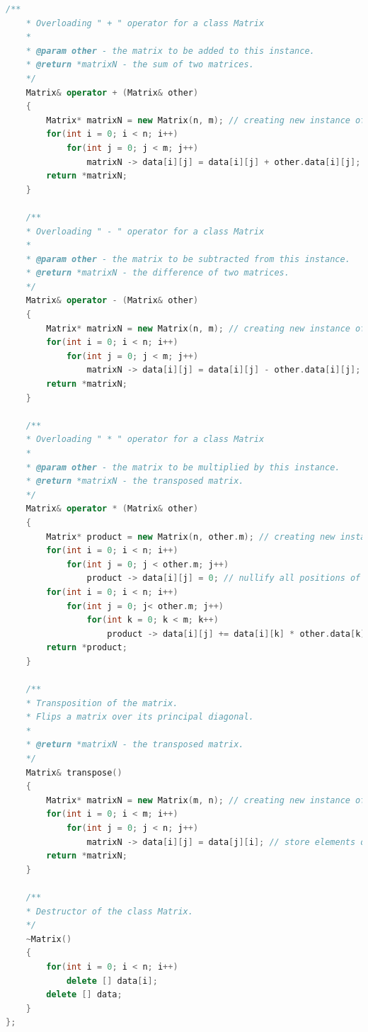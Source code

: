 \documentclass[11pt]{article}
\begin{document}
\begin{lstlisting}[language=C++, caption=Implementation of Predator-prey model]
    /**
    * Overloading " + " operator for a class Matrix
    *
    * @param other - the matrix to be added to this instance.
    * @return *matrixN - the sum of two matrices.
    */
    Matrix& operator + (Matrix& other)
    {
        Matrix* matrixN = new Matrix(n, m); // creating new instance of the class Matrix to store the result
        for(int i = 0; i < n; i++)
            for(int j = 0; j < m; j++)
                matrixN -> data[i][j] = data[i][j] + other.data[i][j]; // store the result of an addition
        return *matrixN;
    }

    /**
    * Overloading " - " operator for a class Matrix
    *
    * @param other - the matrix to be subtracted from this instance.
    * @return *matrixN - the difference of two matrices.
    */
    Matrix& operator - (Matrix& other)
    {
        Matrix* matrixN = new Matrix(n, m); // creating new instance of the class Matrix to store the result
        for(int i = 0; i < n; i++)
            for(int j = 0; j < m; j++)
                matrixN -> data[i][j] = data[i][j] - other.data[i][j]; // store the result of a subtraction
        return *matrixN;
    }

    /**
    * Overloading " * " operator for a class Matrix
    *
    * @param other - the matrix to be multiplied by this instance.
    * @return *matrixN - the transposed matrix.
    */
    Matrix& operator * (Matrix& other)
    {
        Matrix* product = new Matrix(n, other.m); // creating new instance of the class Matrix to store the result
        for(int i = 0; i < n; i++)
            for(int j = 0; j < other.m; j++)
                product -> data[i][j] = 0; // nullify all positions of a new matrix
        for(int i = 0; i < n; i++)
            for(int j = 0; j< other.m; j++)
                for(int k = 0; k < m; k++)
                    product -> data[i][j] += data[i][k] * other.data[k][j]; // store the result of multiplication
        return *product;
    }

    /**
    * Transposition of the matrix.
    * Flips a matrix over its principal diagonal.
    *
    * @return *matrixN - the transposed matrix.
    */
    Matrix& transpose()
    {
        Matrix* matrixN = new Matrix(m, n); // creating new instance of the class Matrix to store the result
        for(int i = 0; i < m; i++)
            for(int j = 0; j < n; j++)
                matrixN -> data[i][j] = data[j][i]; // store elements of a particular row in the corresponding column
        return *matrixN;
    }

    /**
    * Destructor of the class Matrix.
    */
    ~Matrix()
    {
        for(int i = 0; i < n; i++)
            delete [] data[i];
        delete [] data;
    }
};


\end{lstlisting}
\end{document}
